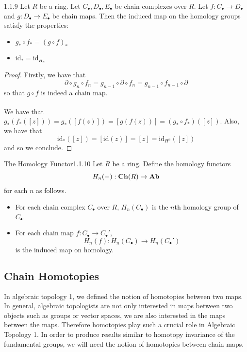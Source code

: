 \documentclass[a4paper]{article}
\begin{document}
\begin{prp}{}{1.1.9} Let $R$ be a ring. Let $C_\bullet,D_\bullet,E_\bullet$ be chain complexes over $R$. Let $f:C_\bullet\to D_\bullet$ and $g:D_\bullet\to E_\bullet$ be chain maps. Then the induced map on the homology groups satisfy the properties: 
\begin{itemize}
\item $g_\ast\circ f_\ast=(g\circ f)_\ast$
\item $\text{id}_\ast=\text{id}_{H_n}$
\end{itemize} \tcbline
\begin{proof}
Firstly, we have that $$\partial\circ g_n\circ f_n=g_{n-1}\circ\partial\circ f_n=g_{n-1}\circ f_{n-1}\circ\partial$$ so that $g\circ f$ is indeed a chain map. \\~\\

We have that $g_\ast(f_\ast([z]))=g_\ast([f(z)])=[g(f(z))]=(g_\ast\circ f_\ast)([z])$. Also, we have that $$\text{id}_\ast([z])=[\text{id}(z)]=[z]=\text{id}_{H^n}([z])$$ and so we conclude. 
\end{proof}
\end{prp}

\begin{defn}{The Homology Functor}{1.1.10} Let $R$ be a ring. Define the homology functors $$H_n(-):\bold{Ch}(R)\to\bold{Ab}$$ for each $n$ as follows. 
\begin{itemize}
\item For each chain complex $C_\bullet$ over $R$, $H_n(C_\bullet)$ is the $n$th homology group of $C_\bullet$. 
\item For each chain map $f:C_\bullet\to C_\bullet'$, $$H_n(f):H_n(C_\bullet)\to H_n(C_\bullet')$$ is the induced map on homology. 
\end{itemize}
\end{defn}

\subsection{Chain Homotopies}
In algebraic topology 1, we defined the notion of homotopies between two maps. In general, algebraic topologists are not only interested in maps between two objects such as groups or vector spaces, we are also interested in the maps between the maps. Therefore homotopies play such a crucial role in Algebraic Topology 1. In order to produce results similar to homotopy invariance of the fundamental groups, we will need the notion of homotopies between chain maps. \\
\end{document}
